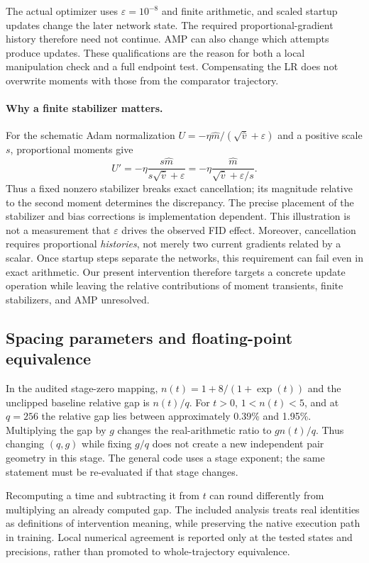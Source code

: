 The actual optimizer uses $\varepsilon=10^{-8}$ and finite arithmetic, and scaled startup updates change the later network state. The required proportional-gradient history therefore need not continue. AMP can also change which attempts produce updates. These qualifications are the reason for both a local manipulation check and a full endpoint test. Compensating the LR does not overwrite moments with those from the comparator trajectory.

\paragraph{Why a finite stabilizer matters.}
For the schematic Adam normalization $U=-\eta\widehat m/(\sqrt{\widehat v}+\varepsilon)$ and a positive scale $s$, proportional moments give
\begin{equation}
 U'=-\eta\frac{s\widehat m}{s\sqrt{\widehat v}+\varepsilon}
    =-\eta\frac{\widehat m}{\sqrt{\widehat v}+\varepsilon/s}.
\end{equation}
Thus a fixed nonzero stabilizer breaks exact cancellation; its magnitude relative to the second moment determines the discrepancy. The precise placement of the stabilizer and bias corrections is implementation dependent. This illustration is not a measurement that $\varepsilon$ drives the observed FID effect. Moreover, cancellation requires proportional \emph{histories}, not merely two current gradients related by a scalar. Once startup steps separate the networks, this requirement can fail even in exact arithmetic. Our present intervention therefore targets a concrete update operation while leaving the relative contributions of moment transients, finite stabilizers, and AMP unresolved.

\subsection{Spacing parameters and floating-point equivalence}
In the audited stage-zero mapping, $n(t)=1+8/(1+\exp(t))$ and the unclipped baseline relative gap is $n(t)/q$. For $t>0$, $1<n(t)<5$, and at $q=256$ the relative gap lies between approximately 0.39\% and 1.95\%. Multiplying the gap by $g$ changes the real-arithmetic ratio to $gn(t)/q$. Thus changing $(q,g)$ while fixing $g/q$ does not create a new independent pair geometry in this stage. The general code uses a stage exponent; the same statement must be re-evaluated if that stage changes.

Recomputing a time and subtracting it from $t$ can round differently from multiplying an already computed gap. The included analysis treats real identities as definitions of intervention meaning, while preserving the native execution path in training. Local numerical agreement is reported only at the tested states and precisions, rather than promoted to whole-trajectory equivalence.

